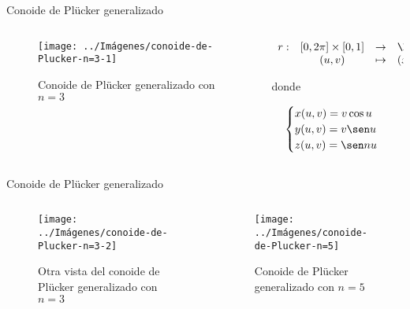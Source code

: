 \documentclass[10pt]{beamer}
\begin{document}
	\begin{frame}{Conoide de Plücker generalizado}
		\begin{columns}[t] %
			\begin{column}{.50\textwidth}
				\begin{figure}
					\centering
					\texttt{[image: ../Imágenes/conoide-de-Plucker-n=3-1]}
					\caption{Conoide de Plücker generalizado con $n=3$}
					\label{fig:conoide-de-Plucker-generalizado-1}
				\end{figure}
			\end{column}%
			\hfill%
			\begin{column}{.50\textwidth}
				$$\begin{array}{rcll}
				r : & [0, 2\pi] \times [0,1] & \to & \R^3\\
				& (u,v) & \mapsto & (x,y,z)
				\end{array}$$
				
				donde 
				
				$$ \begin{cases}
				x(u,v) = v \cos u \\
				y(u,v) = v \sen u \\
				z(u,v) = \sen nu
				\end{cases} $$
			\end{column}%
		\end{columns}
	\end{frame}
	
	\begin{frame}{Conoide de Plücker generalizado}
		\begin{columns}[b] %
			\begin{column}{.50\textwidth}
				\begin{figure}
					\centering
					\texttt{[image: ../Imágenes/conoide-de-Plucker-n=3-2]}
					\caption{Otra vista del conoide de Plücker generalizado con $n=3$}
					\label{fig:conoide-de-Plücker-generalizado-2}
				\end{figure}
			\end{column}%
			\hfill%
			\begin{column}{.50\textwidth}
					\begin{figure}
						\centering
						\texttt{[image: ../Imágenes/conoide-de-Plucker-n=5]}
						\caption{Conoide de Plücker generalizado con $n=5$}
						\label{fig:conoide-de-Plucker-generalizado-3}
					\end{figure}
			\end{column}%
		\end{columns}
	\end{frame}
	
\end{document}
